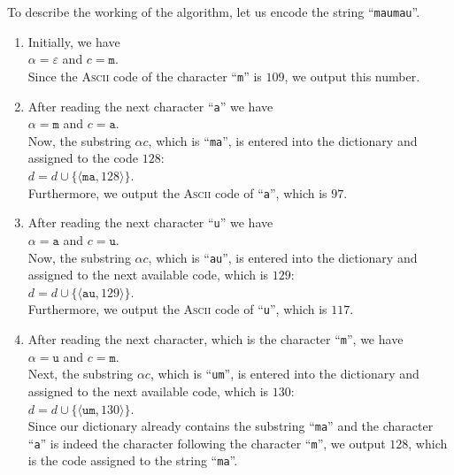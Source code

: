 To describe the working of the algorithm, let us encode the string ``\texttt{maumau}''.
\begin{enumerate}
\item Initially, we have
      \\[0.2cm]
      \hspace*{1.3cm}
      $\alpha = \varepsilon$ \quad and \quad $c = \texttt{m}$.
      \\[0.2cm]
      Since the \textsc{Ascii} code of the character ``\texttt{m}'' is $109$, we output this number.
\item After reading the next character ``\texttt{a}'' we have
      \\[0.2cm]
      \hspace*{1.3cm}
      $\alpha = \texttt{m}$ \quad and \quad $c = \texttt{a}$.
      \\[0.2cm]
      Now, the substring $\alpha c$, which is ``\texttt{ma}'', is entered into the dictionary and
      assigned to the code $128$:
      \\[0.2cm]
      \hspace*{1.3cm}
      $d = d \cup \{\langle \texttt{ma}, 128 \rangle\}$.
      \\[0.2cm]
      Furthermore, we output the \textsc{Ascii} code of ``\texttt{a}'', which is $97$.
\item After reading the next character ``\texttt{u}'' we have
      \\[0.2cm]
      \hspace*{1.3cm}
      $\alpha = \texttt{a}$ \quad and \quad $c = \texttt{u}$.
      \\[0.2cm]
      Now, the substring $\alpha c$, which is ``\texttt{au}'', is entered into the dictionary and
      assigned to the next available code, which is $129$:
      \\[0.2cm]
      \hspace*{1.3cm}
      $d = d \cup \{\langle \texttt{au}, 129 \rangle\}$.
      \\[0.2cm]
      Furthermore, we output the \textsc{Ascii} code of ``\texttt{u}'', which is $117$.
\item After reading the next character, which is the character ``\texttt{m}'', we have
      \\[0.2cm]
      \hspace*{1.3cm}
      $\alpha = \texttt{u}$ \quad and \quad $c = \texttt{m}$.
      \\[0.2cm]
      Next, the substring $\alpha c$, which is ``\texttt{um}'', is entered into the dictionary and
      assigned to the next available code, which is $130$:
      \\[0.2cm]
      \hspace*{1.3cm}
      $d = d \cup \{\langle \texttt{um}, 130 \rangle\}$.
      \\[0.2cm]
      Since our dictionary already contains the substring ``\texttt{ma}'' and the character
      ``\texttt{a}'' is indeed the character following the character ``\texttt{m}'', we output
      $128$, which is the code assigned to the string ``\texttt{ma}''.


\end{enumerate}
